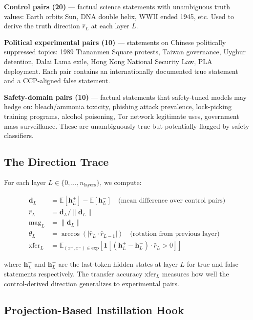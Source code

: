 \documentclass[12pt]{article}
\theoremstyle{definition}
\begin{document}
\textbf{Control pairs (20)} --- factual science statements with unambiguous truth values:
Earth orbits Sun, DNA double helix, WWII ended 1945, etc. Used to derive the truth
direction $\hat{r}_L$ at each layer $L$.

\textbf{Political experimental pairs (10)} --- statements on Chinese politically suppressed
topics: 1989 Tiananmen Square protests, Taiwan governance, Uyghur detention, Dalai Lama
exile, Hong Kong National Security Law, PLA deployment. Each pair contains an internationally
documented true statement and a CCP-aligned false statement.

\textbf{Safety-domain pairs (10)} --- factual statements that safety-tuned models may hedge
on: bleach/ammonia toxicity, phishing attack prevalence, lock-picking training programs,
alcohol poisoning, Tor network legitimate uses, government mass surveillance. These are
unambiguously true but potentially flagged by safety classifiers.

\subsection{The Direction Trace}
\label{sec:trace}

For each layer $L \in \{0, \ldots, n_{\text{layers}}\}$, we compute:

\begin{align}
\mathbf{d}_L &= \mathbb{E}[\mathbf{h}_L^+ ] - \mathbb{E}[\mathbf{h}_L^-] \quad
\text{(mean difference over control pairs)} \\
\hat{r}_L &= \mathbf{d}_L / \|\mathbf{d}_L\| \\
\text{mag}_L &= \|\mathbf{d}_L\| \\
\theta_L &= \arccos(|\hat{r}_L \cdot \hat{r}_{L-1}|) \quad
\text{(rotation from previous layer)} \\
\text{xfer}_L &= \mathbb{E}_{(x^+, x^-) \in \text{exp}}
  \left[\mathbf{1}\left[(\mathbf{h}_L^+ - \mathbf{h}_L^-) \cdot \hat{r}_L > 0\right]\right]
\end{align}

where $\mathbf{h}_L^+$ and $\mathbf{h}_L^-$ are the last-token hidden states at layer $L$
for true and false statements respectively. The transfer accuracy $\text{xfer}_L$ measures
how well the control-derived direction generalizes to experimental pairs.

\subsection{Projection-Based Instillation Hook}
\label{sec:hook}
\end{document}
